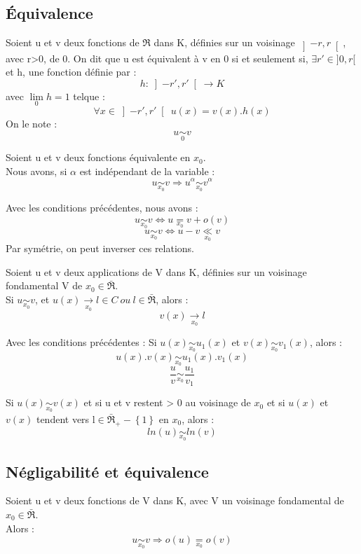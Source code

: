 \subsection{Équivalence}
\begin{enon}
Soient u et v deux fonctions de $\Re$ dans K, définies sur un voisinage $\left]-r,r \right[ $, avec r>0, de 0.
On dit que u est équivalent à v en 0 si et seulement si, $\exists r' \in ]0,r[$ et h, une fonction définie par : 
$$h : \left] -r',r' \right[  \rightarrow K$$
avec $\lim\limits_{0} h = 1$ telque : 
$$\forall x \in \left]-r',r'\right[~ u(x) = v(x).h(x)$$
On le note :
$$u \underset{0}\sim v$$
\end{enon}
\begin{prop}
Soient u et v deux fonctions équivalente en $x_0$.\\
Nous avons, si $\alpha$ est indépendant de la variable :
$$u \underset{x_0}\sim v \Rightarrow u^{\alpha} \underset{x_0}\sim v^{\alpha}$$
\end{prop}
\begin{prop}
Avec les conditions précédentes, nous avons :
$$u \underset{x_0}\sim v \Leftrightarrow u \underset{x_0}= v + o(v)$$
$$u \underset{x_0}\sim v \Leftrightarrow u-v \underset{x_0}\ll v$$
Par symétrie, on peut inverser ces relations.
\end{prop}
\begin{prop}
Soient u et v deux applications de V dans K, définies sur un voisinage fondamental V de $x_0\in \bar{\Re}$.\\
Si $u \underset{x_0}\sim v$, et $u(x) \underset{x_0}\rightarrow l \in C~ ou~ l \in \bar{\Re}$, alors :
$$v(x) \underset{x_0}\rightarrow l$$
\end{prop}
\begin{prop}
Avec les conditions précédentes :
Si $u(x) \underset{x_0}\sim u_1(x)$ et $v(x) \underset{x_0}\sim v_1(x)$, alors : 
$$u(x).v(x) \underset{x_0}\sim u_1(x).v_1(x)$$
$$\dfrac{u}{v} \underset{x_0}\sim \dfrac{u_1}{v_1}$$
\end{prop}
\begin{prop}
Si $u(x) \underset{x_0}\sim v(x)$ et si u et v restent > 0 au voisinage de $x_0$ et si $u(x)$ et $v(x)$ tendent vers l$\in \bar{\Re}_+ -\left\lbrace1\right\rbrace $ en $x_0$, alors :
$$ln(u) \underset{x_0}\sim ln(v)$$
\end{prop}
\subsection{Négligabilité et équivalence}
\begin{prop}
Soient u et v deux fonctions de V dans K, avec V un voisinage fondamental de $x_0 \in \bar{\Re}$.\\
Alors :
$$u \underset{x_0}\sim v \Rightarrow o(u) \underset{x_0}= o(v)$$
\end{prop}

